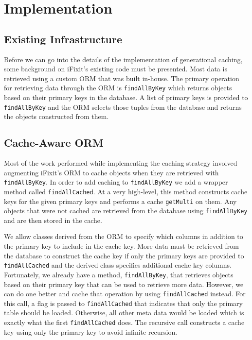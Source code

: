 \documentclass[12pt]{ucthesis}
\begin{document}
\section{Implementation}
\subsection{Existing Infrastructure}
Before we can go into the details of the implementation of generational caching, some background on \textsf{iFixit}'s existing code must be presented.
Most data is retrieved using a custom ORM that was built in-house.
The primary operation for retrieving data through the ORM is {\tt findAllByKey} which returns objects based on their primary keys in the database.
A list of primary keys is provided to {\tt findAllByKey} and the ORM selects those tuples from the database and returns the objects constructed from them.

\subsection{Cache-Aware ORM}
Most of the work performed while implementing the caching strategy involved augmenting \textsf{iFixit}'s ORM to cache objects when they are retrieved with {\tt findAllByKey}.
In order to add caching to {\tt findAllByKey} we add a wrapper method called {\tt findAllCached}.
At a very high-level, this method constructs cache keys for the given primary keys and performs a cache {\tt getMulti} on them.
Any objects that were not cached are retrieved from the database using {\tt findAllByKey} and are then stored in the cache.

We allow classes derived from the ORM to specify which columns in addition to the primary key to include in the cache key.
More data must be retrieved from the database to construct the cache key if only the primary keys are provided to {\tt findAllCached} and the derived class specifies additional cache key columns.
Fortunately, we already have a method, {\tt findAllByKey}, that retrieves objects based on their primary key that can be used to retrieve more data.
However, we can do one better and cache that operation by using {\tt findAllCached} instead.
For this call, a flag is passed to {\tt findAllCached} that indicates that only the primary table should be loaded.
Otherwise, all other meta data would be loaded which is exactly what the first {\tt findAllCached} does.
The recursive call constructs a cache key using only the primary key to avoid infinite recursion.
\end{document}
